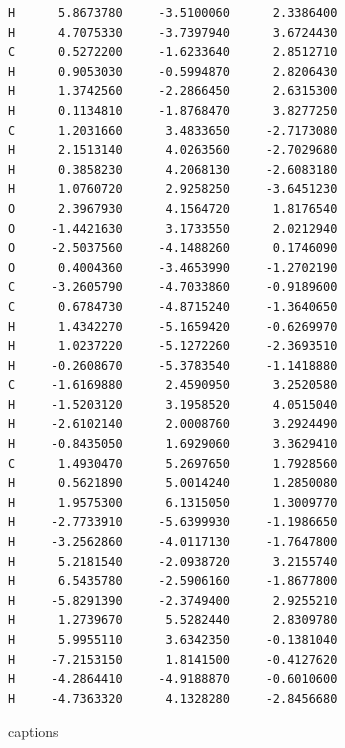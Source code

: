 \documentclass[
digital, %
table,   %
lof,     %
lot,     %
oneside,
]{fithesis3}
\begin{document}
\begin{lstlisting}[frame=single, caption={puvodni struktura C trans },label=DescriptiveLabel]
H      5.8673780     -3.5100060      2.3386400
H      4.7075330     -3.7397940      3.6724430
C      0.5272200     -1.6233640      2.8512710
H      0.9053030     -0.5994870      2.8206430
H      1.3742560     -2.2866450      2.6315300
H      0.1134810     -1.8768470      3.8277250
C      1.2031660      3.4833650     -2.7173080
H      2.1513140      4.0263560     -2.7029680
H      0.3858230      4.2068130     -2.6083180
H      1.0760720      2.9258250     -3.6451230
O      2.3967930      4.1564720      1.8176540
O     -1.4421630      3.1733550      2.0212940
O     -2.5037560     -4.1488260      0.1746090
O      0.4004360     -3.4653990     -1.2702190
C     -3.2605790     -4.7033860     -0.9189600
C      0.6784730     -4.8715240     -1.3640650
H      1.4342270     -5.1659420     -0.6269970
H      1.0237220     -5.1272260     -2.3693510
H     -0.2608670     -5.3783540     -1.1418880
C     -1.6169880      2.4590950      3.2520580
H     -1.5203120      3.1958520      4.0515040
H     -2.6102140      2.0008760      3.2924490
H     -0.8435050      1.6929060      3.3629410
C      1.4930470      5.2697650      1.7928560
H      0.5621890      5.0014240      1.2850080
H      1.9575300      6.1315050      1.3009770
H     -2.7733910     -5.6399930     -1.1986650
H     -3.2562860     -4.0117130     -1.7647800
H      5.2181540     -2.0938720      3.2155740
H      6.5435780     -2.5906160     -1.8677800
H     -5.8291390     -2.3749400      2.9255210
H      1.2739670      5.5282440      2.8309780
H      5.9955110      3.6342350     -0.1381040
H     -7.2153150      1.8141500     -0.4127620
H     -4.2864410     -4.9188870     -0.6010600
H     -4.7363320      4.1328280     -2.8456680

\end{lstlisting}


{\csname captions\languagename\endcsname %
\makeatletter %
\thesis@selectLocale{\thesis@locale}\makeatother
\printbibliography[heading=bibintoc]} %
\appendix %
\end{document}
